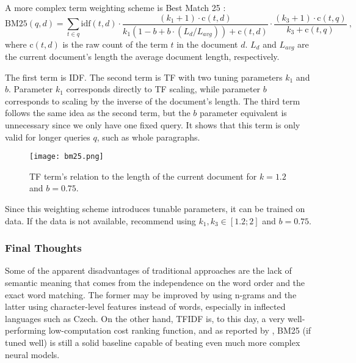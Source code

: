 A more complex term weighting scheme is Best Match 25 \citep{bm25}:
\begin{equation}
\text{BM25}(q, d) = 
        \sum_{t\in q}
        \text{idf}(t, d)
        \cdot \frac{(k_1 + 1)\cdot\text{c}(t, d)}{k_1(1-b + b \cdot (L_d / L_{avg})) + \text{c}(t, d)} 
        \cdot \frac{(k_3 + 1)\cdot\text{c}(t, q)}{k_3 + \text{c}(t, q)}
\ ,
\end{equation}
where $\text{c}(t,d)$ is the raw count of the term $t$ in the document $d$. $L_d$ and $L_{avg}$ are the current document's length the average document length, respectively.

The first term is IDF.
The second term is TF with two tuning parameters $k_1$ and $b$. Parameter $k_1$ corresponds directly to TF scaling, while parameter $b$ corresponds to scaling by the inverse of the document's length.
The third term follows the same idea as the second term, but the $b$ parameter equivalent is unnecessary since we only have one fixed query.
It shows \citep{schutze2008introduction} that this term is only valid for longer queries $q$, such as whole paragraphs. 
\begin{figure}[h!]
    \centering
    \texttt{[image: bm25.png]}
    \caption[BM25 TF Visualization]{TF term's relation to the length of the current document for $k=1.2$ and $b=0.75$.}
\end{figure}

Since this weighting scheme introduces tunable parameters, it can be trained on data. If the data is not available, \citet[Section 11.4.3]{schutze2008introduction} recommend using $k_1, k_3 \in [1.2;2]$ and $b=0.75$.


\subsubsection{Final Thoughts}

Some of the apparent disadvantages of traditional approaches are the lack of semantic meaning that comes from the independence on the word order and the exact word matching. %
The former may be improved by using n-grams and the latter using character-level features instead of words, especially in inflected languages such as Czech.
On the other hand, TFIDF is, to this day, a very well-performing low-computation cost ranking function, and as reported by \cite{weak-baselines}, BM25 (if tuned well) is still a solid baseline capable of beating even much more complex neural models.

